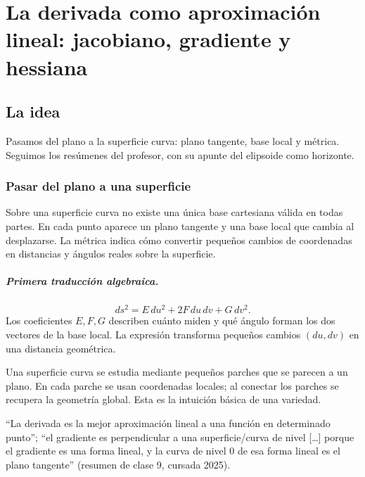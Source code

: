 \chapter{La derivada como aproximación lineal: jacobiano, gradiente y hessiana}\label{cap:derivada}

\section{La idea}


Pasamos del plano a la superficie curva: plano tangente, base local y métrica. Seguimos los resúmenes del profesor, con su apunte del elipsoide como horizonte.

\subsection{Pasar del plano a una superficie}\label{sec:plano-superficie}

{\small\vspace{1mm}\par}


Sobre una superficie curva no existe una única base cartesiana válida en todas partes. En
cada punto aparece un plano tangente y una base local que cambia al desplazarse. La métrica
indica cómo convertir pequeños cambios de coordenadas en distancias y ángulos reales sobre
la superficie.

\paragraph{Primera traducción algebraica.}
\[
  ds^2=E\,du^2+2F\,du\,dv+G\,dv^2.
\]
Los coeficientes \(E,F,G\) describen cuánto miden y qué ángulo forman los dos vectores de la
base local. La expresión transforma pequeños cambios \((du,dv)\) en una distancia geométrica.

\begin{idea}
Una superficie curva se estudia mediante pequeños parches que se parecen a un plano. En cada
parche se usan coordenadas locales; al conectar los parches se recupera la geometría global.
Esta es la intuición básica de una variedad.
\end{idea}

\begin{idea}
``La derivada es la mejor aproximación lineal a una función en determinado punto''; ``el
gradiente es perpendicular a una superficie/curva de nivel [\ldots] porque el gradiente es
una forma lineal, y la curva de nivel 0 de esa forma lineal es el plano tangente'' (resumen de clase 9, cursada 2025).
\end{idea}

